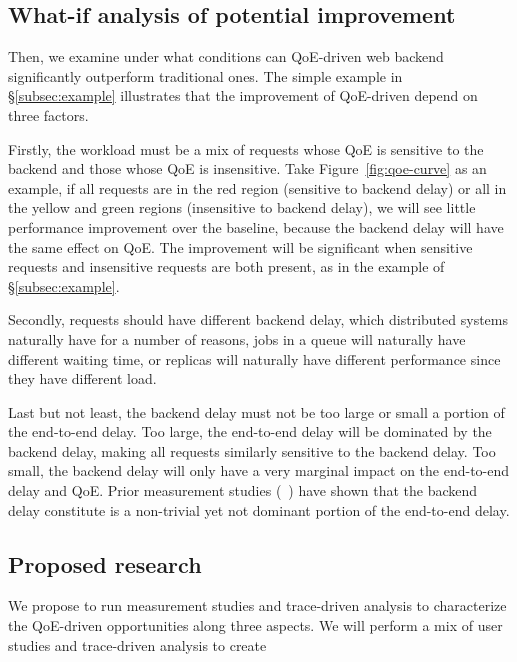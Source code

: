 \subsection{What-if analysis of potential improvement}

Then, we examine under what conditions can QoE-driven web backend significantly outperform traditional ones. 
The simple example in \S\ref{subsec:example} illustrates that the improvement of QoE-driven depend on three factors.

Firstly, the workload must be a mix of requests whose QoE is sensitive to the backend and those whose QoE is insensitive. 
Take Figure~\ref{fig:qoe-curve} as an example, if all requests are in the red region (sensitive to backend delay) or all in the yellow and green regions (insensitive to backend delay), we will see  little performance improvement over the baseline, because the backend delay will have the same effect on QoE. 
The improvement will be significant when sensitive requests and insensitive requests are both present, as in the example of \S\ref{subsec:example}.

Secondly, requests should have different backend delay, which distributed systems naturally have for a number of reasons, \eg jobs in a queue will naturally have different waiting time, or replicas will naturally have different performance since they have different load.

Last but not least, the backend delay must not be too large or small a portion of the end-to-end delay. Too large, the end-to-end delay will be dominated by the backend delay, making all requests similarly sensitive to the backend delay. Too small, the backend delay will only have a very marginal impact on the end-to-end delay and QoE. 
Prior measurement studies (\eg~\cite{dqbarge,mysterymachine,timecard}) have shown that the backend delay constitute is a non-trivial yet not dominant portion of the end-to-end delay.


\subsection{Proposed research}
We propose to run measurement studies and trace-driven analysis to characterize the QoE-driven opportunities along three aspects.
We will perform a mix of user studies and trace-driven analysis to create
%





